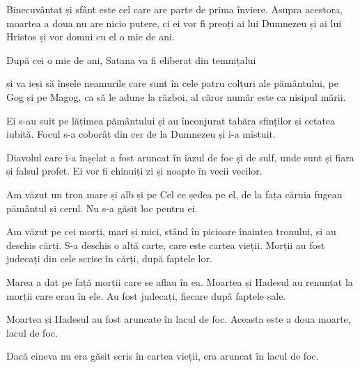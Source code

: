 {Binecuvântat și sfânt este cel care are parte de prima înviere. Asupra acestora, moartea a doua nu are nicio putere, ci ei vor fi preoți ai lui Dumnezeu și ai lui Hristos și vor domni cu el o mie de ani.


\par }{\PP {}După cei o mie de ani, Satana va fi eliberat din temnițalui

și va ieși să înșele neamurile care sunt în cele patru colțuri ale pământului, pe Gog și pe Magog, ca să le adune la război, al căror număr este ca nisipul mării.

Ei s-au suit pe lățimea pământului și au înconjurat tabăra sfinților și cetatea iubită. Focul s-a coborât din cer de la Dumnezeu și i-a mistuit.

Diavolul care i-a înșelat a fost aruncat în iazul de foc și de sulf, unde sunt și fiara și falsul profet. Ei vor fi chinuiți zi și noapte în vecii vecilor.


\par }{\PP {}Am văzut un tron mare și alb și pe Cel ce ședea pe el, de la fața căruia fugeau pământul și cerul. Nu s-a găsit loc pentru ei.

Am văzut pe cei morți, mari și mici, stând în picioare înaintea tronului, și au deschis cărți. S-a deschis o altă carte, care este cartea vieții. Morții au fost judecați din cele scrise în cărți, după faptele lor.

Marea a dat pe față morții care se aflau în ea. Moartea și Hadesul au renunțat la morții care erau în ele. Au fost judecați, fiecare după faptele sale.

Moartea și Hadesul au fost aruncate în lacul de foc. Aceasta este a doua moarte, lacul de foc.

Dacă cineva nu era găsit scris în cartea vieții, era aruncat în lacul de foc.



\par }
